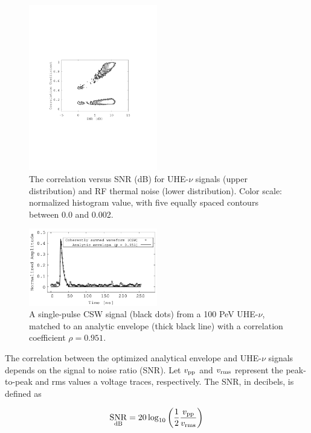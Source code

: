 \documentclass[amsmath,amssymb,aps,prd,10pt,twocolumn,showkeys]{revtex4}
\DeclareMathOperator{\snr}{SNR}
\begin{document}
\begin{itemize}
\begin{figure}
\centering
\includegraphics[width=0.5\textwidth,trim=3.25cm 8.25cm 4.5cm 9.0cm,clip=true]{Aug15_plot2.pdf}
\caption{\label{fig:fig4} The correlation versus SNR (dB) for UHE-$\nu$ signals (upper distribution) and RF thermal noise (lower distribution).  Color scale: normalized histogram value, with five equally spaced contours between 0.0 and 0.002.}
\end{figure}

\begin{figure}
\centering
\includegraphics[width=0.5\textwidth]{Sept25_plot1.pdf}
\caption{\label{fig:example_waveforms} A single-pulse CSW signal (black dots) from a 100 PeV UHE-$\nu$, matched to an analytic envelope (thick black line) with a correlation coefficient $\rho = 0.951$.}
\end{figure}

The correlation between the optimized analytical envelope and UHE-$\nu$ signals depends on the signal to noise ratio (SNR).  Let $v_{\rm pp}$ and $v_{\rm rms}$ represent the peak-to-peak and rms values a voltage traces, respectively.  The SNR, in decibels, is defined as

\begin{equation}
\snr_{\rm dB} = 20\log_{10}\left(\frac{1}{2}\frac{v_{\rm pp}}{v_{\rm rms}}\right)
\end{equation}


\end{itemize}
\end{document}
